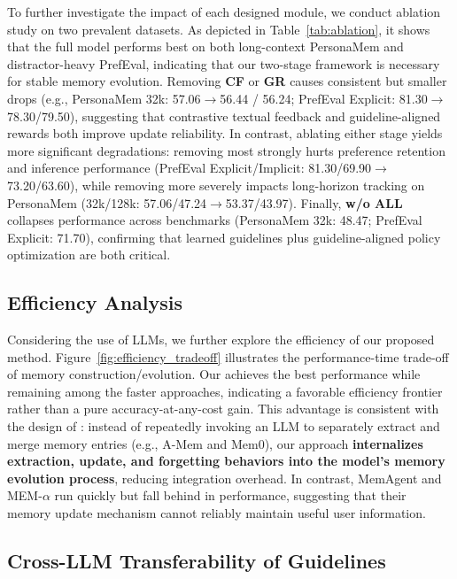 To further investigate the impact of each designed module, we conduct ablation study on two prevalent datasets. As depicted in Table~\ref{tab:ablation}, it shows that the full model performs best on both long-context PersonaMem and distractor-heavy PrefEval, indicating that our two-stage framework is necessary for stable memory evolution. Removing \textbf{CF} or \textbf{GR} causes consistent but smaller drops (e.g., PersonaMem 32k: 57.06$\rightarrow$56.44 / 56.24; PrefEval Explicit: 81.30$\rightarrow$78.30/79.50), suggesting that contrastive textual feedback and guideline-aligned rewards both improve update reliability. In contrast, ablating either stage yields more significant degradations: removing \textbf{\moduleone} most strongly hurts preference retention and inference performance (PrefEval Explicit/Implicit: 81.30/69.90$\rightarrow$73.20/63.60), while removing \textbf{\moduletwo} more severely impacts long-horizon tracking on PersonaMem (32k/128k: 57.06/47.24$\rightarrow$53.37/43.97). Finally, \textbf{w/o ALL} collapses performance across benchmarks (PersonaMem 32k: 48.47; PrefEval Explicit: 71.70), confirming that learned guidelines plus guideline-aligned policy optimization are both critical.



\subsection{Efficiency Analysis}

Considering the use of LLMs, we further explore the efficiency of our proposed method. Figure~\ref{fig:efficiency_tradeoff} illustrates the performance-time trade-off of memory construction/evolution. Our \ourmodel achieves the best performance while remaining among the faster approaches, indicating a favorable efficiency frontier rather than a pure accuracy-at-any-cost gain. This advantage is consistent with the design of \ourmodel: instead of repeatedly invoking an LLM to separately extract and merge memory entries (e.g., A-Mem and Mem0), our approach \textbf{internalizes extraction, update, and forgetting behaviors into the model’s memory evolution process}, reducing integration overhead. In contrast, MemAgent and MEM-$\alpha$ run quickly but fall behind in performance, suggesting that their memory update mechanism cannot reliably maintain useful user information.


\subsection{Cross-LLM Transferability of Guidelines}


